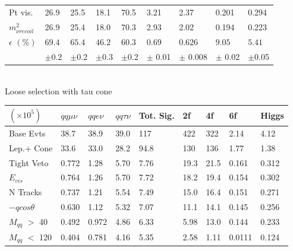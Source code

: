 \begin{table}
\begin{tabular}{|p{}|p{}p{}p{}p{}p{}p{}p{}p{}|}
Pt vis. & {26.9 } &  {25.5} &  {18.1} & {70.5} &  {3.21} &  {2.37} &  {0.201} &  {0.294} \\ 

$m^2_{\nu recoil}$ & {26.9 } &  {25.4 } &  {18.0} & {70.3} &  {2.93} &  {2.02} &  {0.194} &  {0.223} \\ 
\hline 

 $\epsilon \, \, (\%)$ & $69.4 $ & $65.4 $ & $46.2$ &  $60.3 $ & $0.69 $ & $0.626 $ & $9.05 $ & $5.41 $ \\ 
 
 			& $\pm$0.2 & $\pm$0.2 & $\pm$0.3 & $\pm$0.2 & $\pm$ 0.01 & $\pm$ 0.008 & $\pm$ 0.02 & $\pm$0.05 \\
\hline
\end{tabular}
\quad \quad \\
Loose selection with tau cone\\
\begin{tabular}{|p{}|p{}p{}p{}p{}p{}p{}p{}p{}|}
\hline 
 $(\times 10^5)$  & $qq\mu\nu$ & $qqe\nu$ & $qq\tau\nu$ & Tot. Sig. & 2f & 4f & 6f & Higgs \\ \hline 
Base Evts & {38.7 } &  {38.9 } &  {39.0} & {117} &  {422} &  {322} &  {2.14} &  {4.12} \\ 
 
Lep.+ Cone & {33.6 } &  {33.0 } &  {28.2} & {94.8} &  {130} &  {136} &  {1.77} &  {1.38} \\ 

Tight Veto & {0.772 } &  {1.28 } &  {5.70} & {7.76} &  {19.3} &  {21.5} &  {0.161} &  {0.312} \\ 
 
$E_{vis}$ & {0.764 } &  {1.26 } &  {5.70} & {7.72} &  {18.2} &  {19.4} &  {0.154} &  {0.302} \\ 

N Tracks & {0.737 } &  {1.21 } &  {5.54} & {7.49} &  {15.0} &  {16.4} &  {0.151} &  {0.271} \\ 
 
$-qcos\theta$ & {0.630 } &  {1.12 } &  {5.32} & {7.07} &  {11.1} &  {14.1} &  {0.145} &  {0.256} \\ 
 
$M_{qq}$ $>$ 40 & {0.492 } &  {0.972 } &  {4.86} & {6.33} &  {5.98} &  {13.0} &  {0.144} &  {0.233} \\ 

$M_{qq}$ $<$ 120 & {0.404 } &  {0.781 } &  {4.16} & {5.35} &  {2.58} &  {1.11} &  {0.0111} &  {0.124} \\ 
 

\end{tabular}
\end{table}

